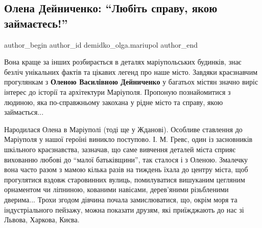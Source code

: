  
 
 
 
 
 
\subsection{Олена Дейниченко: \enquote{Любіть справу, якою займаєтесь!}}
\label{sec:27_01_2020.stz.news.ua.mrpl_city.1.olena_dejnychenko_ljubit_spravu}
 
\ifcmt
 author_begin
   author_id demidko_olga.mariupol
 author_end
\fi

Вона краще за інших розбирається в деталях маріупольських будинків, знає безліч
унікальних фактів та цікавих легенд про наше місто. Завдяки краєзнавчим
прогулянкам з \textbf{Оленою Василівною Дейниченко} у багатьох містян значно виріс
інтерес до історії та архітектури Маріуполя. Пропоную познайомитися з людиною,
яка по-справжньому закохана у рідне місто та справу, якою займається...

Народилася Олена в Маріуполі (тоді ще у Жданові). Особливе ставлення до
Маріуполя у нашої героїні виникло поступово. І. М. Гревс, один із засновників
шкільного краєзнавства, зазначав, що саме вивчення деталей міста сприяє
вихованню любові до \enquote{малої батьківщини}, так сталося і з Оленою. Змалечку вона
часто разом з мамою кілька разів на тиждень їхала до центру міста, щоб
прогулятися вздовж старовинних вулиць, помилуватися вишуканим цегляним
орнаментом чи ліпниною, кованими навісами, дерев'яними різьбленими дверима...
Трохи згодом дівчина почала замислюватися, що, окрім моря та індустріального
пейзажу, можна показати друзям, які приїжджають до нас зі Львова, Харкова,
Києва.


